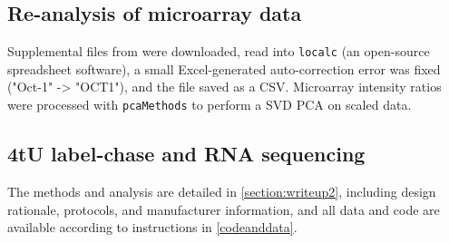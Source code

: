{\subsection{Re-analysis of microarray data} 

Supplemental files from \cite{Airoldi2016} were 
downloaded, read
into \texttt{localc} (an open-source spreadsheet software), 
a small Excel-generated auto-correction error was 
fixed ("Oct-1" -> "OCT1"), and the file saved as a CSV. Microarray 
intensity ratios were processed with 
\texttt{pcaMethods} to perform a SVD PCA on scaled data. 

\subsection{4tU label-chase and RNA sequencing}

The methods and analysis are detailed in \autoref{section:writeup2},
including design rationale, protocols, and manufacturer information,
and all data and code are available according to instructions in
\autoref{codeanddata}.

}
